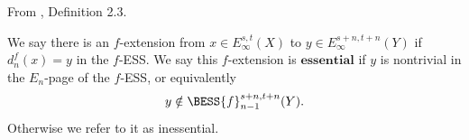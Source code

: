 \begin{definition}
\label{paper:2.3}
From \cite{LWX126}, Definition 2.3.\par
\label{def:768fba8a}
    We say there is an $f$-extension from $x\in E_\infty^{s,t}(X)$ to $y\in E_\infty^{s+n,t+n}(Y)$ if $d_n^{f}(x)=y$ in the $f$-ESS. We say this $f$-extension is $\textbf{essential}$ if $y$ is nontrivial in the $E_n$-page of the $f$-ESS, or equivalently $$y\notin \BESS{f}^{s+n,t+n}_{n-1}(Y).$$
    Otherwise we refer to it as inessential.




\sketch
\end{definition}

